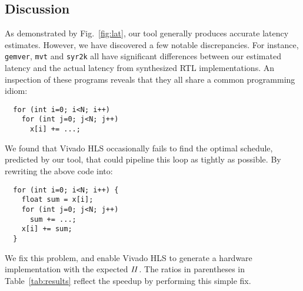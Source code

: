\subsection{Discussion}
\label{sec:results_discussion}

As demonstrated by Fig.~\ref{fig:lat}, our tool generally produces accurate
latency estimates. However, we have discovered a few notable discrepancies. For
instance, \verb|gemver|, \verb|mvt| and \verb|syr2k| all have significant
differences between our estimated latency and the actual latency from
synthesized RTL implementations.  An inspection of these programs reveals that
they all share a common programming idiom:
%
\begin{lstlisting}
  for (int i=0; i<N; i++)
    for (int j=0; j<N; j++)
      x[i] += ...;
\end{lstlisting}
%
We found that Vivado HLS occasionally fails to find the optimal schedule,
predicted by our tool, that could pipeline this loop as tightly as possible.
By rewriting the above code into:
%
\begin{lstlisting}
  for (int i=0; i<N; i++) {
    float sum = x[i];
    for (int j=0; j<N; j++)
      sum += ...;
    x[i] += sum;
  }
\end{lstlisting}
%
We fix this problem, and enable Vivado HLS to generate a hardware implementation
with the expected $\mathit{II}$. The ratios in parentheses in Table~\ref{tab:results}
reflect the speedup by performing this simple fix.

